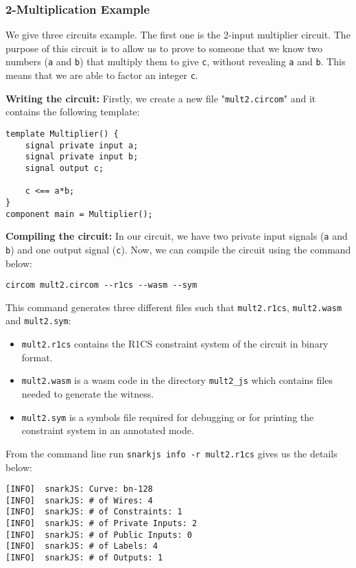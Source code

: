 \documentclass[a4paper,oneside,12pt]{book}
\begin{document}
\subsubsection{2-Multiplication Example}
\noindent We give three circuits example. The first one is the 2-input multiplier circuit. The purpose of this circuit is to allow us to prove to someone that we know two numbers (\verb|a| and \verb|b|) that multiply them to give \verb|c|, without revealing \verb|a| and \verb|b|. This means that we are able to factor an integer \verb|c|.  

\noindent \textbf{Writing the circuit:} Firstly, we create a new file "\verb|mult2.circom|" and it contains the following template:

\begin{verbatim}
template Multiplier() {
    signal private input a;
    signal private input b;
    signal output c;

    c <== a*b;
}
component main = Multiplier();

\end{verbatim}

\noindent \textbf{Compiling the circuit:} In our circuit, we have two private input signals (\verb|a| and \verb|b|) and one output signal (\verb|c|). Now, we can compile the circuit using the command below:

\begin{verbatim}
circom mult2.circom --r1cs --wasm --sym
\end{verbatim}

\noindent This command generates three different files such that \verb|mult2.r1cs|, \verb|mult2.wasm| and \verb|mult2.sym|:
\begin{itemize}
	\item \verb|mult2.r1cs| contains the R1CS constraint system of the circuit in binary format.
	\item \verb|mult2.wasm| is a wasm code in the directory \verb|mult2_js| which contains files needed to generate the witness.
	\item \verb|mult2.sym| is a symbols file required for debugging or for printing the constraint system in an annotated mode.
\end{itemize}

\noindent From the command line run \verb|snarkjs info -r mult2.r1cs| gives us the details below:

\begin{verbatim}
[INFO]  snarkJS: Curve: bn-128
[INFO]  snarkJS: # of Wires: 4
[INFO]  snarkJS: # of Constraints: 1
[INFO]  snarkJS: # of Private Inputs: 2
[INFO]  snarkJS: # of Public Inputs: 0
[INFO]  snarkJS: # of Labels: 4
[INFO]  snarkJS: # of Outputs: 1
\end{verbatim}
\end{document}
